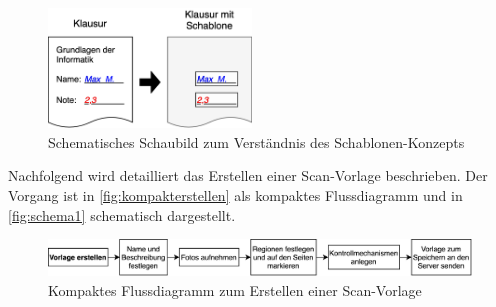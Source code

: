 \documentclass[notables, nomenclature, oneside, 150]{HSMW-Thesis}
\begin{document}
		\begin{figure}[th]
    		\centering
    		\includegraphics[width=0.48\textwidth]{img/schablone1}
    		\caption{Schematisches Schaubild zum Verständnis des Schablonen-Konzepts}
    		\label{fig:schablone1}
    	\end{figure}
		
		Nachfolgend wird detailliert das Erstellen einer Scan-Vorlage beschrieben. Der Vorgang ist in \autoref{fig:kompakterstellen} als kompaktes Flussdiagramm und in \autoref{fig:schema1} schematisch dargestellt.
		
		 \begin{figure}[th]
    		\centering
    		\includegraphics[width=\textwidth]{img/erstellen_flow_small}
    		\caption{Kompaktes Flussdiagramm zum Erstellen einer Scan-Vorlage}
    		\label{fig:kompakterstellen}
    	\end{figure}
	
\end{document}
